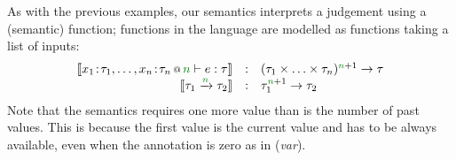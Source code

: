 As with the previous examples, our semantics interprets a judgement using a (semantic) function;
functions in the language are modelled as functions taking a list of inputs:
%
\begin{equation*}
\begin{array}{rcl}
\sem{\coctx{x_1\!:\!\tau_1, \ldots, x_n\!:\!\tau_n}{ \cclrd{n} } \vdash e : \tau}
  &:& (\tau_1 \times \ldots \times \tau_n)^{\cclrd{n}+1} \rightarrow \tau\\
\sem{\tau_1 \xrightarrow{\cclrd{n}} \tau_2} &:& \tau_1^{\cclrd{n}+1} \rightarrow \tau_2
\end{array}
\end{equation*}
%
Note that the semantics requires one more value than is the number of past values. This is because
the first value is the current value and has to be always available, even when the annotation is
zero as in (\emph{var}).




